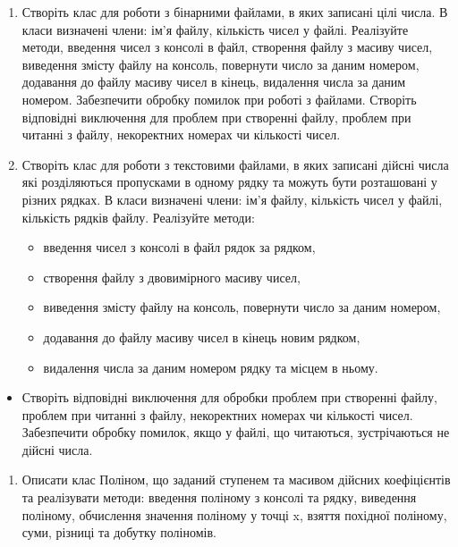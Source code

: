 \documentclass[]{article}
\begin{document}
\begin{enumerate}
\def\labelenumi{\arabic{enumi}.}
\item
  Створіть клас для роботи з бінарними файлами, в яких записані цілі
  числа. В класи визначені члени: ім'я файлу, кількість чисел у файлі.
  Реалізуйте методи, введення чисел з консолі в файл, створення файлу з
  масиву чисел, виведення змісту файлу на консоль, повернути число за
  даним номером, додавання до файлу масиву чисел в кінець, видалення
  числа за даним номером. Забезпечити обробку помилок при роботі з
  файлами. Створіть відповідні виключення для проблем при створенні
  файлу, проблем при читанні з файлу, некоректних номерах чи кількості
  чисел.
\item
  Створіть клас для роботи з текстовими файлами, в яких записані дійсні
  числа які розділяються пропусками в одному рядку та можуть бути
  розташовані у різних рядках. В класи визначені члени: ім'я файлу,
  кількість чисел у файлі, кількість рядків файлу. Реалізуйте методи:

  \begin{itemize}
  \item
    введення чисел з консолі в файл рядок за рядком,
  \item
    створення файлу з двовимірного масиву чисел,
  \item
    виведення змісту файлу на консоль, повернути число за даним номером,
  \item
    додавання до файлу масиву чисел в кінець новим рядком,
  \item
    видалення числа за даним номером рядку та місцем в ньому.
  \end{itemize}
\end{enumerate}

\begin{itemize}
\item
  Створіть відповідні виключення для обробки проблем при створенні
  файлу, проблем при читанні з файлу, некоректних номерах чи кількості
  чисел. Забезпечити обробку помилок, якщо у файлі, що читаються,
  зустрічаються не дійсні числа.
\end{itemize}

\begin{enumerate}
\def\labelenumi{\arabic{enumi}.}
\item
  Описати клас Поліном, що заданий ступенем та масивом дійсних
  коефіцієнтів та реалізувати методи: введення поліному з консолі та
  рядку, виведення поліному, обчислення значення поліному у точці x,
  взяття похідної поліному, суми, різниці та добутку поліномів.
\end{enumerate}
\end{document}
